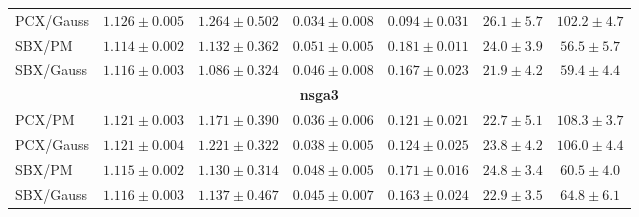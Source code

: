 \begin{table}[!htbp]
\begin{tabular}{lcccccc}
PCX/Gauss & $\mathbf{1.126 \pm 0.005}$ & $1.264 \pm 0.502$ & $\mathbf{0.034 \pm 0.008}$ & $\mathbf{0.094 \pm 0.031}$ & $26.1 \pm 5.7$ & $102.2 \pm 4.7$ \\
SBX/PM & $1.114 \pm 0.002$ & $1.132 \pm 0.362$ & $0.051 \pm 0.005$ & $0.181 \pm 0.011$ & $24.0 \pm 3.9$ & $\mathbf{56.5 \pm 5.7}$ \\
SBX/Gauss & $1.116 \pm 0.003$ & $\mathbf{1.086 \pm 0.324}$ & $0.046 \pm 0.008$ & $0.167 \pm 0.023$ & $21.9 \pm 4.2$ & $59.4 \pm 4.4$ \\
\midrule
\multicolumn{7}{c}{\textbf{\acrshort{nsga3}}} \\
\cmidrule(lr){1-7}
PCX/PM & $\mathbf{1.121 \pm 0.003}$ & $1.171 \pm 0.390$ & $\mathbf{0.036 \pm 0.006}$ & $\mathbf{0.121 \pm 0.021}$ & $22.7 \pm 5.1$ & $108.3 \pm 3.7$ \\
PCX/Gauss & $1.121 \pm 0.004$ & $1.221 \pm 0.322$ & $0.038 \pm 0.005$ & $0.124 \pm 0.025$ & $23.8 \pm 4.2$ & $106.0 \pm 4.4$ \\
SBX/PM & $1.115 \pm 0.002$ & $\mathbf{1.130 \pm 0.314}$ & $0.048 \pm 0.005$ & $0.171 \pm 0.016$ & $\mathbf{24.8 \pm 3.4}$ & $\mathbf{60.5 \pm 4.0}$ \\
SBX/Gauss & $1.116 \pm 0.003$ & $1.137 \pm 0.467$ & $0.045 \pm 0.007$ & $0.163 \pm 0.024$ & $22.9 \pm 3.5$ & $64.8 \pm 6.1$ \\
\bottomrule
\end{tabular}
\end{table}


